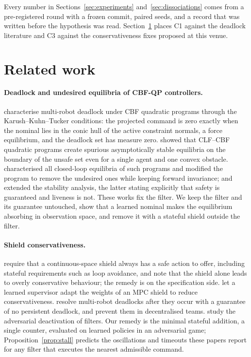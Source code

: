 \documentclass{l4dc2027}
\begin{document}
Every number in Sections~\ref{sec:experiments} and~\ref{sec:dissociations} comes from a pre-registered round with a frozen commit, paired seeds, and a record that was written before the hypothesis was read. Section~\ref{sec:related} places C1 against the deadlock literature and C3 against the conservativeness fixes proposed at this venue.

\section{Related work}\label{sec:related}

\paragraph{Deadlock and undesired equilibria of CBF-QP controllers.} \citet{grover2020symmetry,grover2021deadlock,grover2023before} characterise multi-robot deadlock under CBF quadratic programs through the Karush--Kuhn--Tucker conditions: the projected command is zero exactly when the nominal lies in the conic hull of the active constraint normals, a force equilibrium, and the deadlock set has measure zero. \citet{reis2021cbfqp} showed that CLF--CBF quadratic programs create spurious asymptotically stable equilibria on the boundary of the unsafe set even for a single agent and one convex obstacle. \citet{tan2024undesired} characterised all closed-loop equilibria of such programs and modified the program to remove the undesired ones while keeping forward invariance; \citet{reis2026stability} and \citet{reis2025unified} extended the stability analysis, the latter stating explicitly that safety is guaranteed and liveness is not. These works fix the filter. We keep the filter and its guarantee untouched, show that a learned nominal makes the equilibrium absorbing in observation space, and remove it with a stateful shield outside the filter.

\paragraph{Shield conservativeness.} \citet{kim2025realizable} require that a continuous-space shield always has a safe action to offer, including stateful requirements such as loop avoidance, and note that the shield alone leads to overly conservative behaviour; the remedy is on the specification side. \citet{dawood2025dynamic} let a learned supervisor adapt the weights of an MPC shield to reduce conservativeness. \citet{wang2025neurosymbolic} resolve multi-robot deadlocks after they occur with a guarantee of no persistent deadlock, and \citet{lee2025merrygoround} prevent them in decentralised teams. \citet{arnstrom2025stealthy} study the adversarial deactivation of filters. Our remedy is the minimal stateful addition, a single counter, evaluated on learned policies in an adversarial game; Proposition~\ref{prop:stall} predicts the oscillations and timeouts these papers report for any filter that executes the nearest admissible command.
\end{document}
